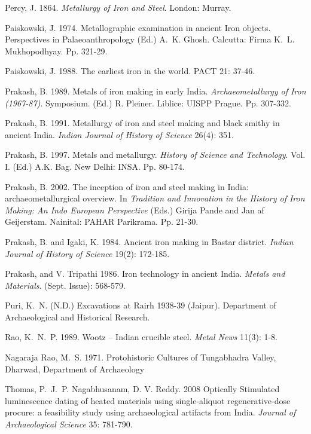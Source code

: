 \begin{thebibliography}{99}
 Percy, J. 1864. \textit{Metallurgy of Iron and Steel}. London: Murray.

 Paiskowski, J. 1974. Metallographic examination in ancient Iron objects. Perspectives in Palaeoanthropology (Ed.) A.~K. Ghosh. Calcutta: Firma K.~L. Mukhopodhyay. Pp. 321-29.

 Paiskowski, J. 1988. The earliest iron in the world. PACT 21: 37-46. 

 Prakash, B. 1989. Metals of iron making in early India. \textit{Archaeometallurgy of Iron (1967-87)}. Symposium. (Ed.) R. Pleiner. Liblice: UISPP Prague. Pp. 307-332. 

 Prakash, B. 1991. Metallurgy of iron and steel making and black smithy in ancient India. \textit{Indian Journal of History of Science} 26(4): 351.

 Prakash, B. 1997. Metals and metallurgy. \textit{History of Science and Technology}. Vol. I. (Ed.) A.K. Bag. New Delhi: INSA. Pp. 80-174.

 Prakash, B. 2002. The inception of iron and steel making in India: archaeometallurgical overview. In \textit{Tradition and Innovation in the History of Iron Making: An Indo European Perspective} (Eds.) Girija Pande and Jan af Geijerstam.  Nainital: PAHAR Parikrama. Pp. 21-30.

 Prakash, B. and Igaki, K. 1984. Ancient iron making in Bastar district. \textit{Indian Journal of History of Science} 19(2): 172-185. 

 Prakash, and V. Tripathi 1986. Iron technology in ancient India. \textit{Metals and Materials}. (Sept. Issue): 568-579. 

 Puri, K.~N. (N.D.) Excavations at Rairh 1938-39 (Jaipur). Department of Archaeological and Historical Research. 

 Rao, K.~N.~P. 1989. Wootz – Indian crucible steel. \textit{Metal News} 11(3): 1-8.

 Nagaraja Rao, M.~S. 1971. Protohistoric Cultures of Tungabhadra Valley, Dharwad, Department of Archaeology 

 Thomas, P.~J.~P. Nagabhusanam, D. V. Reddy. 2008 Optically Stimulated luminescence dating of heated materials using single-aliquot regenerative-dose procure: a feasibility study using archaeological artifacts from India. \textit{Journal of Archaeological Science} 35: 781-790.


\end{thebibliography}
